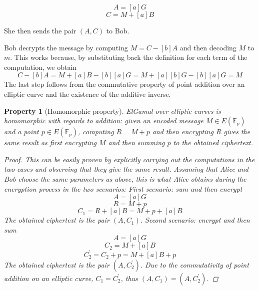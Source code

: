 \documentclass{report}
\newtheorem{property}{Property}
\begin{document}
$$A=[a]G$$
$$C=M+[a]B$$

\noindent
She then sends the pair $(A, C)$ to Bob. \newline
\par
Bob decrypts the message by computing $M=C-[b]A$ and then decoding $M$ to $m$. This works because, by substituting back the definition for each term of the computation, we obtain
		$$C-[b]A=M+[a]B-[b][a]G=M+[a][b]G-[b][a]G=M$$ 
		The last step follows from the commutative property of point addition over an elliptic curve and the existence of the additive inverse.

\begin{property}[Homomorphic property]
ElGamal over elliptic curves is homomorphic with regards to addition: given an encoded message $M \in E(\mathds{F}_p)$ and a point $p \in E(\mathds{F}_p)$, computing $R=M+p$ and
then encrypting $R$ gives the same result as first encrypting $M$ and then summing $p$ to the obtained ciphertext. 
\begin{proof}
This can be easily proven by explicitly carrying out the computations in the two cases and observing that they give the same result. Assuming that Alice and Bob choose the same parameters 
as above, this is what Alice obtains during the encryption process in the two scenarios:
\newline \newline
\textit{First scenario: sum and then encrypt}
$$A=[a]G$$
$$R=M+p$$
$$C_1=R+[a]B=M+p+[a]B$$ 
The obtained ciphertext is the pair $(A, C_1)$.
\newline \newline
\textit{Second scenario: encrypt and then sum}
$$A=[a]G$$
$$C_2=M+[a]B$$
$$C_2^{'}=C_2+p=M+[a]B+p$$
The obtained ciphertext is the pair $(A, C_2^{'})$.
\newline \newline
Due to the commutativity of point addition on an elliptic curve, $C_1=C_2^{'}$, thus $(A, C_1)=(A, C_2^{'})$.
\end{proof}
\end{property}
\end{document}
